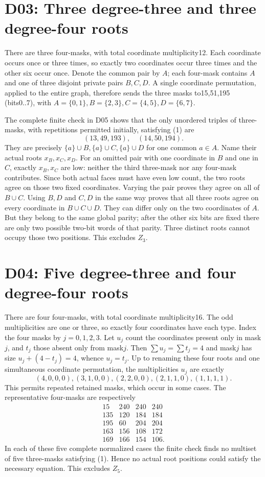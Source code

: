 \documentclass{article}
\begin{document}
\section{D03: Three degree-three and three degree-four roots}
There are three four-masks, with total coordinate multiplicity12. Each
coordinate occurs once or three times, so exactly two coordinates occur
three times and the other six occur once. Denote the common pair by $A$;
each four-mask contains $A$ and one of three disjoint private pairs
$B,C,D$. A single coordinate permutation, applied to the entire graph,
therefore sends the three masks to15,51,195 (bits0..7), with
$A=\{0,1\},B=\{2,3\},C=\{4,5\},D=\{6,7\}$.

The complete finite check in D05 shows that the only unordered triples
of three-masks, with repetitions permitted initially, satisfying (1)
are
\[
 (13,49,193),\quad(14,50,194).
\]
They are precisely $\{a\}\cup B,\{a\}\cup C,\{a\}\cup D$ for one
common $a\in A$. Name their actual roots $x_B,x_C,x_D$.
For an omitted pair with one coordinate in $B$ and one in $C$, exactly
$x_B,x_C$ are low: neither the third three-mask nor any four-mask
contributes. Since both actual faces must have even low count, the two
roots agree on those two fixed coordinates. Varying the pair proves
they agree on all of $B\cup C$. Using $B,D$ and $C,D$ in the same way
proves that all three roots agree on every coordinate in $B\cup C\cup D$.
They can differ only on the two coordinates of $A$. But they belong
to the same global parity; after the other six bits are fixed there
are only two possible two-bit words of that parity. Three distinct
roots cannot occupy those two positions. This excludes $Z_3$.

\section{D04: Five degree-three and four degree-four roots}
There are four four-masks, with total coordinate multiplicity16. The
odd multiplicities are one or three, so exactly four coordinates have
each type. Index the four masks by $j=0,1,2,3$. Let $u_j$ count the
coordinates present only in mask$j$, and $t_j$ those absent only from
mask$j$. Then $\sum u_j=\sum t_j=4$ and mask$j$ has size
$u_j+(4-t_j)=4$, whence $u_j=t_j$.
Up to renaming these four roots and one simultaneous coordinate
permutation, the multiplicities $u_j$ are exactly
\[
 (4,0,0,0),(3,1,0,0),(2,2,0,0),(2,1,1,0),(1,1,1,1).
\]
This permits repeated retained masks, which occur in some cases.
The representative four-masks are respectively
\[
\begin{array}{rrrr}
15&240&240&240\\135&120&184&184\\195&60&204&204\\
163&156&108&172\\169&166&154&106.
\end{array}
\]
In each of these five complete normalized cases the finite check finds
no multiset of five three-masks satisfying (1). Hence no actual root
positions could satisfy the necessary equation. This excludes $Z_5$.
\end{document}
